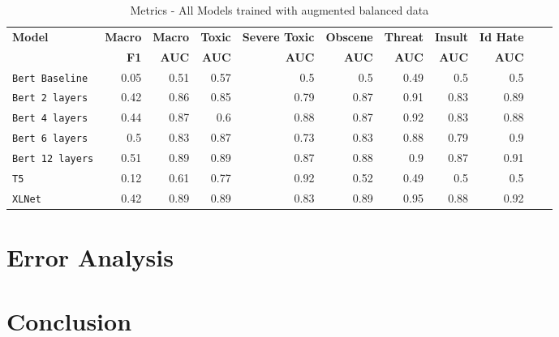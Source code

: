 \documentclass[11pt,a4paper]{article}
\begin{document}
\begin{table}
\centering
\begin{tabular}{lrrrrrrrrrr}
\hline
\textbf{Model} & \textbf{Macro} & \textbf{Macro} & \textbf{Toxic} & \textbf{Severe Toxic} & \textbf{Obscene} & \textbf{Threat} & \textbf{Insult} & \textbf{Id Hate}
\\
\textbf{ } & \textbf{F1} & \textbf{AUC} & \textbf{AUC} & \textbf{AUC} & \textbf{AUC} & \textbf{AUC} & \textbf{AUC} & \textbf{AUC}\\
\hline
\verb|Bert Baseline| & 0.05 & 0.51 & 0.57 & 0.5 & 0.5 & 0.49 & 0.5 & 0.5 \\
\verb|Bert 2 layers| & 0.42 & 0.86 & 0.85 & 0.79 & 0.87 & 0.91 & 0.83 & 0.89 \\
\verb|Bert 4 layers| & 0.44 & 0.87 & 0.6 & 0.88 & 0.87 & 0.92 & 0.83 & 0.88 \\
\verb|Bert 6 layers| & 0.5 & 0.83 & 0.87 & 0.73 & 0.83 & 0.88 & 0.79 & 0.9 \\
\verb|Bert 12 layers| & 0.51 & 0.89 & 0.89 & 0.87 & 0.88 & 0.9 & 0.87 & 0.91 \\
\verb|T5| & 0.12 & 0.61 & 0.77 & 0.92 & 0.52 & 0.49 & 0.5 & 0.5 \\
\verb|XLNet| & 0.42 & 0.89 & 0.89 & 0.83 & 0.89 & 0.95 & 0.88 & 0.92 \\
\hline
\end{tabular}
\caption{Metrics - All Models trained with augmented balanced data}
\label{table:BalResults}
\end{table}

\section{Error Analysis}

\section{Conclusion}
\end{document}
